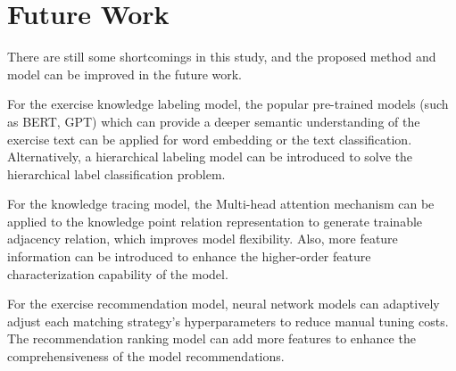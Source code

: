 \section{Future Work}

There are still some shortcomings in this study, and the proposed method and model can be improved in the future work.

For the exercise knowledge labeling model, the popular pre-trained models (such as BERT, GPT) which can provide a deeper semantic understanding of the exercise text can be applied for word embedding or the text classification. Alternatively, a hierarchical labeling model can be introduced to solve the hierarchical label classification problem.

For the knowledge tracing model, the Multi-head attention mechanism can be applied to the knowledge point relation representation to generate trainable adjacency relation, which improves model flexibility. Also, more feature information can be introduced to enhance the higher-order feature characterization capability of the model.

For the exercise recommendation model, neural network models can adaptively adjust each matching strategy's hyperparameters to reduce manual tuning costs. The recommendation ranking model can add more features to enhance the comprehensiveness of the model recommendations.